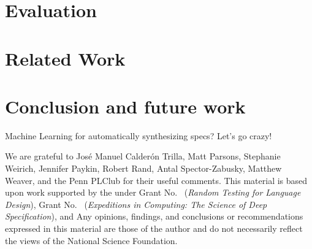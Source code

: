 \documentclass[acmsmall,review]{acmart}\settopmatter{}
\begin{document}
\section{Evaluation}
\label{sec:eval}

\section{Related Work}
\label{sec:related}


\section{Conclusion and future work}
\label{sec:concl}

Machine Learning for automatically synthesizing specs? Let's go crazy!

\begin{acks}                            %
We are grateful to
%
Jos\'e Manuel Calder\'on Trilla,
Matt Parsons,
Stephanie Weirich,
Jennifer Paykin,
Robert Rand,
Antal Spector-Zabusky,
Matthew Weaver,
and the Penn PLClub
for their useful comments.
This material is based upon work supported by the
 under Grant
No.~ ({\em Random Testing for Language
Design}), Grant No.~ ({\em Expeditions
in Computing: The Science of Deep Specification}), and  Any opinions, findings, and
conclusions or recommendations expressed in this material are those of
the author and do not necessarily reflect the views of the National
Science Foundation.

\end{acks}

%



%
\end{document}
